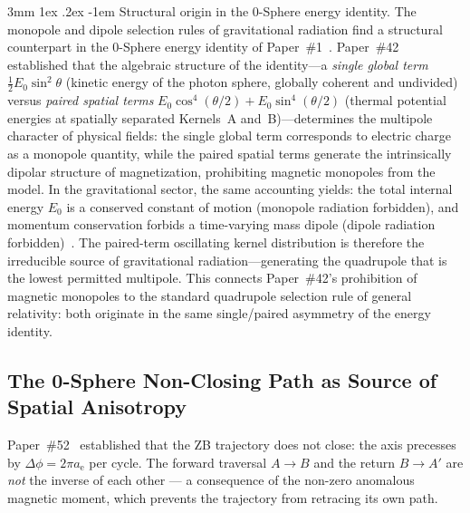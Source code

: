 \documentclass[%
 reprint, amsmath,amssymb, aps, prd, ]{revtex4-2}
\makeatletter
\numberwithin{equation}{section}
\renewcommand\paragraph{%
  \@startsection{paragraph}{4}{\z@}%
    {3mm \@plus 1ex \@minus .2ex}%
    {-1em}%
    {\normalfont\normalsize\itshape}}
\newcommand{\iphase}{\theta}
\newcommand{\anom}{a_{\mathrm{e}}}
\makeatother
\begin{document}
\paragraph{Structural origin in the 0-Sphere energy identity.}
The monopole and dipole selection rules of gravitational radiation find a structural counterpart in the 0-Sphere energy identity of Paper~\#1~\cite{hanamura01}.
Paper~\#42~\cite{hanamura42} established that the algebraic structure of the identity---a \emph{single global term} $\tfrac{1}{2}E_0\sin^2\iphase$ (kinetic energy of the photon sphere, globally coherent and undivided) versus \emph{paired spatial terms} $E_0\cos^4(\iphase/2) + E_0\sin^4(\iphase/2)$ (thermal potential energies at spatially separated Kernels~A and~B)---determines the multipole character of physical fields: the single global term corresponds to electric charge as a monopole quantity, while the paired spatial terms generate the intrinsically dipolar structure of magnetization, prohibiting magnetic monopoles from the model.
In the gravitational sector, the same accounting yields: the total internal energy $E_0$ is a conserved constant of motion (monopole radiation forbidden), and momentum conservation forbids a time-varying mass dipole (dipole radiation forbidden)~\cite{Hartle2003}.
The paired-term oscillating kernel distribution is therefore the irreducible source of gravitational radiation---generating the quadrupole that is the lowest permitted multipole.
This connects Paper~\#42's prohibition of magnetic monopoles to the standard quadrupole selection rule of general relativity: both originate in the same single/paired asymmetry of the energy identity.

\subsection{The 0-Sphere Non-Closing Path as Source of Spatial Anisotropy}

Paper~\#52~\cite{hanamura52} established that the ZB trajectory does not close: the axis precesses by $\Delta\phi = 2\pi\anom$ per cycle.
The forward traversal $A \to B$ and the return $B \to A'$ are \emph{not} the inverse of each other --- a consequence of the non-zero anomalous magnetic moment, which prevents the trajectory from retracing its own path.
\end{document}
